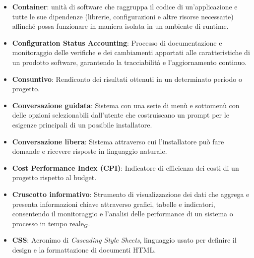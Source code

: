 \begin{itemize}
\item \textbf{Container}: unità di software che raggruppa il codice di un'applicazione e tutte le sue dipendenze (librerie, configurazioni e altre risorse necessarie) affinché possa funzionare in maniera isolata in un ambiente di runtime.
    \item \textbf{Configuration Status Accounting}: Processo di documentazione e monitoraggio delle verifiche e dei cambiamenti apportati alle caratteristiche di un prodotto software, garantendo la tracciabilità e l'aggiornamento continuo.
    \item \textbf{Consuntivo}: Rendiconto dei risultati ottenuti in un determinato periodo o progetto.
    \item \textbf{Conversazione guidata}: Sistema con una serie di menù e sottomenù con delle opzioni
    selezionabili dall’utente che costruiscano un prompt per le esigenze principali di un
    possibile installatore.
    \item \textbf{Conversazione libera}: Sistema attraverso cui l’installatore può
    fare domande e ricevere risposte in linguaggio naturale.
    \item \textbf{Cost Performance Index (CPI)}: Indicatore di efficienza dei costi di un progetto rispetto al budget.
    \item \textbf{Cruscotto informativo}: Strumento di visualizzazione dei dati che aggrega e presenta informazioni chiave attraverso grafici, tabelle e indicatori, consentendo il monitoraggio e l'analisi delle performance di un sistema o processo in tempo reale$_G$.
    \item \textbf{CSS}: Acronimo di \textit{Cascading Style Sheets}, linguaggio usato per definire il design e la formattazione di documenti HTML.
    
\end{itemize}
